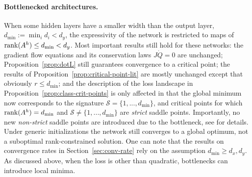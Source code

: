 \documentclass{article}
\def\rank{{\rm rank}}
\newcommand{\1}{\mathds{1}}
\begin{document}
\paragraph{Bottlenecked architectures.}
When some hidden layers have a smaller width than the output layer, $d_{\min} := \min_i d_i < d_y $, the expressivity of the network is restricted to maps of $\rank(A^h) \leq d_{\min} < d_y $. Most important results still hold for these networks: the gradient flow equations and its conservation laws $J\dot{Q}=0$ are unchanged; Proposition~\ref{prop:dotL} still guarantees convergence to a critical point; the results of Proposition~\ref{prop:critical-point-lit} are mostly unchanged except that obviously $r\leq d_{\min}$; and the description of the loss landscape in Proposition~\ref{prop:class-crit-points} is only affected in that the global minimum now corresponds to the signature $\mathcal{S}=\{1,...,d_{\min}\}$, and critical points for which $\rank(A^h) = d_{\min}$ and $\mathcal{S}\neq \{1,...,d_{\min}\}$ are {\em strict} saddle points. 
Importantly, no new {\em non-strict} saddle points are introduced due to the bottleneck, see \cite{achour2021loss} for details. Under generic initializations the network still converges to a global optimum, not a suboptimal rank-constrained solution. One can note that the results on convergence rates in Section~\ref{sec:conv-rate} rely on the assumption $d_{\min} \geq d_x,d_y$. As discussed above, when the loss is other than quadratic, bottlenecks can introduce local minima.
\end{document}
